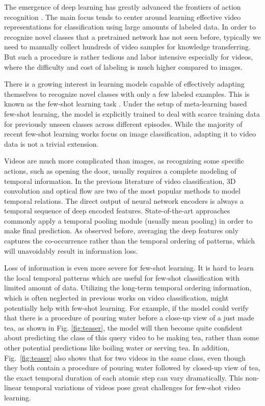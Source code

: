 \documentclass[10pt,twocolumn,letterpaper]{article}
\begin{document}
The emergence of deep learning has greatly advanced the frontiers of action recognition \cite{wang2016temporal,carreira2017quo}. The main focus tends to center around learning effective video representations for classification using large amounts of labeled data.  In order to recognize novel classes that a pretrained network has not seen before, typically we need to manually collect hundreds of video samples for knowledge transferring. But such a procedure is rather tedious and labor intensive especially for videos, where the difficulty and cost of labeling is much higher compared to images.

There is a growing interest in learning models capable of effectively adapting themselves to recognize novel classes with only a few labeled examples. This is known as the few-shot learning task \cite{garcia2017few,chen19closerfewshot}. Under the setup of meta-learning based few-shot learning, the model is explicitly trained to deal with scarce training data for previously unseen classes across different episodes. While the majority of recent few-shot learning works focus on image classification, adapting it to video data is not a trivial extension.

Videos are much more complicated than images, as recognizing some specific actions, such as opening the door, usually requires a complete modeling of temporal information. In the previous literature of video classification, 3D convolution and optical flow are two of the most popular methods to model temporal relations. The direct output of neural network encoders is always a temporal sequence of deep encoded features.
State-of-the-art approaches commonly apply a temporal pooling module (usually mean pooling) in order to make final prediction. As observed before, averaging the deep features only captures the co-occurrence rather than the temporal ordering of patterns, which will unavoidably result in information loss. 

Loss of information is even more severe for few-shot learning. 
It is hard to learn the local temporal patterns which are useful for few-shot classification with limited amount of data. Utilizing the long-term temporal ordering information, which is often neglected in previous works on video classification, might potentially help with few-shot learning. For example, if the model could verify that there is a procedure of pouring water before a close-up view of a just made tea, as shown in Fig. \ref{fig:teaser}, the model will then become quite confident about predicting the class of this query video to be making tea, rather than some other potential predictions like boiling water or serving tea. 
In addition, Fig.~\ref{fig:teaser} also shows that for two videos in the same class, even though they both contain a procedure of pouring water followed by closed-up view of tea, the exact temporal duration of each atomic step can vary dramatically. This non-linear temporal variations of videos pose great challenges for few-shot video learning. 
\end{document}
